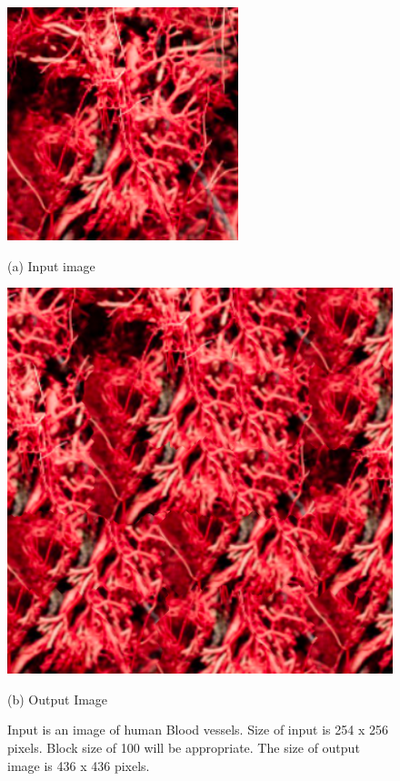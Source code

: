 \documentclass[12pt,a4paper]{report}
\begin{document}
\begin{figure}[H]
  \centering
  \centering
  \includegraphics[scale=0.45]{pics/blood_vessels.png}
  \caption*{(a) Input image}
  \endminipage
  \centering
  \includegraphics[scale=0.5]{pics/blood_vessels_100_5.png}
    \caption*{(b) Output Image}
  \endminipage
  \caption{Input is an image of human Blood vessels. Size of input is 254 x 256 pixels. Block size of 100 will be appropriate. The size of output image is 436 x 436 pixels.}
  
\end{figure}
\end{document}
